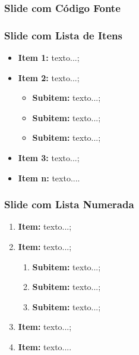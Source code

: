 \begin{frame}

    \frametitle{Slide com Código Fonte}
    
    \centering
    \resizebox{10cm}{!}{%
         
    }
    
\end{frame}


\begin{frame}

    \frametitle{Slide com Lista de Itens}
    
    \begin{itemize}
       	\item \textbf{Item 1:} texto...;
       	\item \textbf{Item 2:} texto...;
       	\begin{itemize}
       		\item \textbf{Subitem:} texto...;
       		\item \textbf{Subitem:} texto...;
       		\item \textbf{Subitem:} texto...;
       	\end{itemize}
       	\item \textbf{Item 3:} texto...;
       	\item \textbf{Item n:} texto....
    \end{itemize}
         
\end{frame}


\begin{frame}

    \frametitle{Slide com Lista Numerada}
    
    \begin{enumerate}
       	\item \textbf{Item:} texto...;
       	\item \textbf{Item:} texto...;
       	\begin{enumerate}
       		\item \textbf{Subitem:} texto...;
       		\item \textbf{Subitem:} texto...;
       		\item \textbf{Subitem:} texto...;
       	\end{enumerate}
       	\item \textbf{Item:} texto...;
       	\item \textbf{Item:} texto....
    \end{enumerate}
         
\end{frame}


